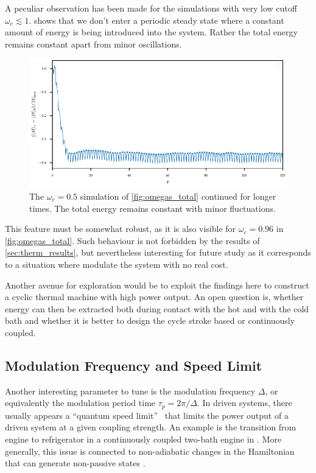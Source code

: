 A peculiar observation has been made for the simulations with very low
cutoff \(ω_{c}\lesssim 1\).  shows that we
don't enter a periodic steady state where a constant amount of energy
is being introduced into the system. Rather the total energy remains
constant apart from minor oscillations.
\begin{figure}[htp]
  \centering
  \includegraphics{figs/one_bath_mod/total_for_steady}
  \caption{\label{fig:total_for_steady} The \(ω_{c}=0.5\) simulation of
    \cref{fig:omegas_total} continued for longer times. The total
    energy remains constant with minor fluctuations.}
\end{figure}
This feature must be somewhat robust, as it is also visible for
\(ω_{c}=0.96\) in \cref{fig:omegas_total}. Such behaviour is not
forbidden by the results of \cref{sec:therm_results}, but nevertheless
interesting for future study as it corresponds to a situation where
modulate the system with no real cost.

Another avenue for exploration would be to exploit the findings here
to construct a cyclic thermal machine with high power output. An open
question is, whether energy can then be extracted both during contact
with the hot and with the cold bath and whether it is better to design
the cycle stroke based or continuously coupled.


\subsection{Modulation Frequency and Speed Limit}
\label{sec:speedlim}
Another interesting parameter to tune is the modulation frequency
\(Δ\), or equivalently the modulation period time \(τ_{p}=2π/Δ\). In
driven systems, there usually appears a ``quantum speed
limit''~\cite{Kurizki2021Dec} that limits the power output of a driven
system at a given coupling strength. An example is the transition from
engine to refrigerator in a continuously coupled two-bath engine in
\cite{Mukherjee2020Jan}. More generally, this issue is connected to
non-adiabatic changes in the Hamiltonian that can generate non-passive
states \cite{Binder2018}.

